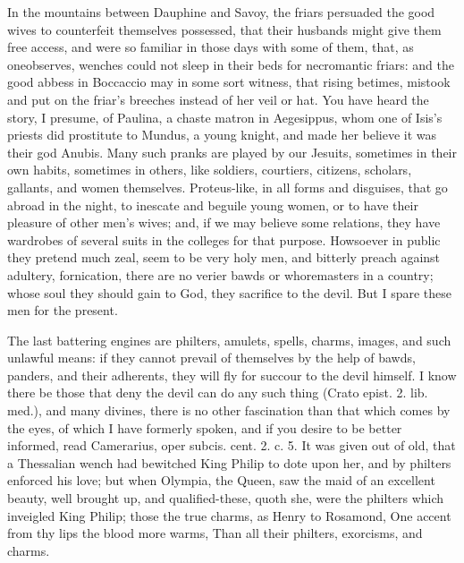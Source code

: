 In the mountains between Dauphine and Savoy, the friars persuaded
the good wives to counterfeit themselves possessed, that their husbands
might give them free access, and were so familiar in those days with
some of them, that, as oneobserves, wenches could not sleep in
their beds for necromantic friars: and the good abbess in Boccaccio may
in some sort witness, that rising betimes, mistook and put on the
friar's breeches instead of her veil or hat. You have heard the story,
I presume, of  Paulina, a chaste matron in Aegesippus, whom one
of Isis's priests did prostitute to Mundus, a young knight, and made
her believe it was their god Anubis. Many such pranks are played by our
Jesuits, sometimes in their own habits, sometimes in others, like
soldiers, courtiers, citizens, scholars, gallants, and women
themselves. Proteus-like, in all forms and disguises, that go abroad in
the night, to inescate and beguile young women, or to have their
pleasure of other men's wives; and, if we may believe  some
relations, they have wardrobes of several suits in the colleges for
that purpose. Howsoever in public they pretend much zeal, seem to be
very holy men, and bitterly preach against adultery, fornication, there
are no verier bawds or whoremasters in a country; whose soul they
should gain to God, they sacrifice to the devil. But I spare these men
for the present.

The last battering engines are philters, amulets, spells, charms,
images, and such unlawful means: if they cannot prevail of themselves
by the help of bawds, panders, and their adherents, they will fly for
succour to the devil himself. I know there be those that deny the devil
can do any such thing (Crato epist. 2. lib. med.), and many divines,
there is no other fascination than that which comes by the eyes, of
which I have formerly spoken, and if you desire to be better informed,
read Camerarius, oper subcis. cent. 2. c. 5. It was given out of old,
that a Thessalian wench had bewitched King Philip to dote upon her, and
by philters enforced his love; but when Olympia, the Queen, saw the
maid of an excellent beauty, well brought up, and qualified-these,
quoth she, were the philters which inveigled King Philip; those the
true charms, as Henry to Rosamond,
One accent from thy lips the blood more warms,
Than all their philters, exorcisms, and charms.

